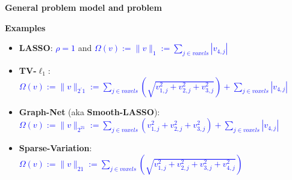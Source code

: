 \documentclass[french]{STIC_poster}
\begin{document}
\begin{frame}[t]
\begin{columns}[t]
\begin{column}{.48\linewidth}
\begin{sxbox}[\textwidth]{\textbf{General problem model and problem}}
\begin{itemize}
\begin{itemize}
                                    \end{itemize}
                                  \begin{nbox}{\textbf{Examples}}
                                  \begin{itemize}
                                  \item \textbf{LASSO}: \textcolor{blue}{$\rho=1$} and \textcolor{blue}{$\Omega(v):=\|v\|_1:= \sum_{j\in voxels}{|v_{4,j}|}$}
                                  \item \textbf{TV-$\ell_1$}:
                                    \textcolor{blue}{$\Omega(v):=\|v\|_{2^{'}1}:=\sum_{j \in voxels}{\left(\sqrt{v_{1,j}^2 + v_{2,j}^2 + v_{3,j}^2}\right)} + \sum_{j \in voxels}{|v_{4,j}|}$}
                                  \item \textbf{Graph-Net} (aka \textbf{Smooth-LASSO}):\\
                                    \textcolor{blue}{$\Omega(v):=\|v\|_{2^21}:=\sum_{j \in voxels}{\left(v_{1,j}^2 + v_{2,j}^2 + v_{3,j}^2\right)} + \sum_{j \in voxels}{|v_{4,j}|}$}
                                  \item \textbf{Sparse-Variation}:
                                    \textcolor{blue}{$\Omega(v):=\|v\|_{21}:=\sum_{j \in voxels}{\left(\sqrt{v_{1,j}^2 + v_{2,j}^2 + v_{3,j}^2 + v_{4,j}^2}\right)}$}
                                  \end{itemize}
                                  \end{nbox}
                                  \end{itemize}


\end{sxbox}
\end{column}
\end{columns}
\end{frame}
\end{document}
